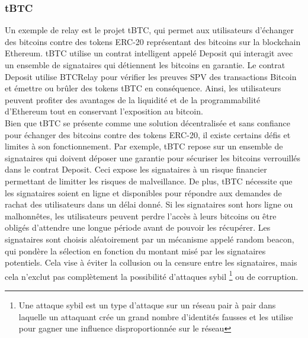 \subsubsection{tBTC}

Un exemple de relay est le projet tBTC, qui permet aux utilisateurs d’échanger des bitcoins contre des 
tokens ERC-20 représentant des bitcoins sur la blockchain Ethereum. tBTC utilise un contrat intelligent 
appelé Deposit qui interagit avec un ensemble de signataires qui détiennent les bitcoins en garantie. 
Le contrat Deposit utilise BTCRelay pour vérifier les preuves SPV des transactions Bitcoin et émettre ou 
brûler des tokens tBTC en conséquence. Ainsi, les utilisateurs peuvent profiter des avantages de la liquidité 
et de la programmabilité d’Ethereum tout en conservant l’exposition au bitcoin. \\
Bien que tBTC se présente comme une solution décentralisée et sans confiance pour échanger des bitcoins contre 
des tokens ERC-20, il existe certains défis et limites à son fonctionnement. 
Par exemple, tBTC repose sur un ensemble de signataires qui doivent déposer une garantie pour sécuriser les bitcoins
verrouillés dans le contrat Deposit. Ceci expose les signataires à un risque financier permettant de limitter les risques de malveillance. 
De plus, tBTC nécessite que les signataires soient en ligne et disponibles pour répondre aux demandes de rachat des 
utilisateurs dans un délai donné. Si les signataires sont hors ligne ou malhonnêtes, les utilisateurs peuvent 
perdre l’accès à leurs bitcoins ou être obligés d’attendre une longue période avant de pouvoir les récupérer. 
Les signataires sont choisis aléatoirement par un mécanisme appelé random beacon, qui pondère la sélection en 
fonction du montant misé par les signataires potentiels. Cela vise à éviter la collusion ou la censure entre les 
signataires, mais cela n’exclut pas complètement la possibilité d’attaques sybil \footnote{Une attaque sybil est 
un type d’attaque sur un réseau pair à pair dans laquelle un attaquant crée un grand nombre d’identités fausses 
et les utilise pour gagner une influence disproportionnée sur le réseau} ou de corruption.